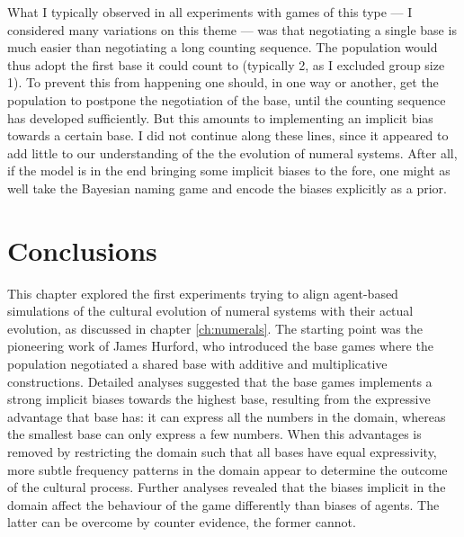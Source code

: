 \documentclass{../src/bcthesispart}
\begin{document}
What I typically observed in all experiments with games of this type — I considered many variations on this theme — was that negotiating a single base is much easier than negotiating a long counting sequence.
The population would thus adopt the first base it could count to (typically 2, as I excluded group size 1).
To prevent this from happening one should, in one way or another, get the population to postpone the negotiation of the base, until the counting sequence has developed sufficiently.
But this amounts to implementing an implicit bias towards a certain base.
I did not continue along these lines, since it appeared to add little to our understanding of the the evolution of numeral systems.
After all, if the model is in the end bringing some implicit biases to the fore, one might as well take the Bayesian naming game and encode the biases explicitly as a prior.







\section{Conclusions}

This chapter explored the first experiments trying to align agent-based simulations of the cultural evolution of numeral systems with their actual evolution, as discussed in chapter \ref{ch:numerals}.
The starting point was the pioneering work of James Hurford, who introduced the  base games where the population negotiated a shared base with additive and multiplicative constructions.
Detailed analyses suggested that the base games implements a strong implicit biases towards the highest base, resulting from the expressive advantage that base has: it can express all the numbers in the domain, whereas the smallest base can only express a few numbers.
When this advantages is removed by restricting the domain such that all bases have equal expressivity, more subtle frequency patterns in the domain appear to determine the outcome of the cultural process.
Further analyses revealed that the biases implicit in the domain affect the behaviour of the game differently than biases of agents.
The latter can be overcome by counter evidence, the former cannot.
\end{document}
